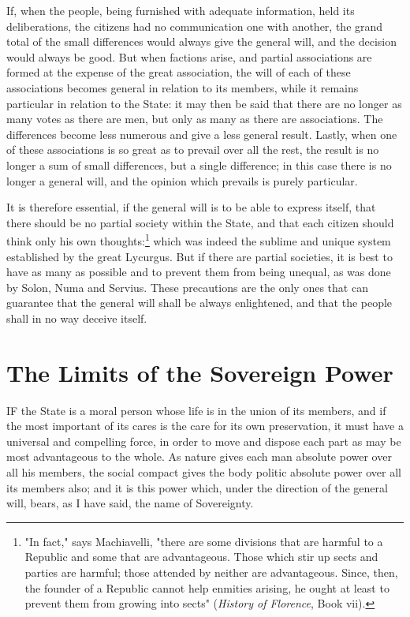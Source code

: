 \documentclass[12pt]{book}
\begin{document}
If, when the people, being furnished with adequate information, held its deliberations, the citizens had no communication one with another, the grand total of the small differences would always give the general will, and the decision would always be good. But when factions arise, and partial associations are formed at the expense of the great association, the will of each of these associations becomes general in relation to its members, while it remains particular in relation to the State: it may then be said that there are no longer as many votes as there are men, but only as many as there are associations. The differences become less numerous and give a less general result. Lastly, when one of these associations is so great as to prevail over all the rest, the result is no longer a sum of small differences, but a single difference; in this case there is no longer a general will, and the opinion which prevails is purely particular.

It is therefore essential, if the general will is to be able to express itself, that there should be no partial society within the State, and that each citizen should think only his own thoughts:\footnote{"In fact," says Machiavelli, "there are some divisions that are harmful to a Republic and some that are advantageous. Those which stir up sects and parties are harmful; those attended by neither are advantageous. Since, then, the founder of a Republic cannot help enmities arising, he ought at least to prevent them from growing into sects" (\textit{History of Florence}, Book vii).} which was indeed the sublime and unique system established by the great Lycurgus. But if there are partial societies, it is best to have as many as possible and to prevent them from being unequal, as was done by Solon, Numa and Servius. These precautions are the only ones that can guarantee that the general will shall be always enlightened, and that the people shall in no way deceive itself.

\section{The Limits of the Sovereign Power}
IF the State is a moral person whose life is in the union of its members, and if the most important of its cares is the care for its own preservation, it must have a universal and compelling force, in order to move and dispose each part as may be most advantageous to the whole. As nature gives each man absolute power over all his members, the social compact gives the body politic absolute power over all its members also; and it is this power which, under the direction of the general will, bears, as I have said, the name of Sovereignty.
\end{document}

